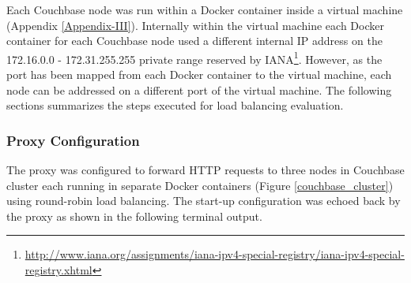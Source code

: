 \documentclass[a4paper,11pt,twoside]{report}
\begin{document}
Each Couchbase node was run within a Docker container inside a virtual machine (Appendix \ref{Appendix-III}). Internally within the virtual machine each Docker container for each Couchbase node used a different internal IP address on the 172.16.0.0 - 172.31.255.255 private range reserved by IANA\footnote{\label{IANA} \url{http://www.iana.org/assignments/iana-ipv4-special-registry/iana-ipv4-special-registry.xhtml}}.  However, as the port has been mapped from each Docker container to the virtual machine, each node can be addressed on a different port of the virtual machine. The following sections summarizes the steps executed for load balancing evaluation.

\subsubsection*{Proxy Configuration} 
The proxy was configured to forward HTTP requests to three nodes in Couchbase cluster each running in separate Docker containers (Figure \ref{couchbase_cluster}) using round-robin load balancing. The start-up configuration was echoed back by the proxy as shown in the following terminal output.\bigskip
\end{document}
